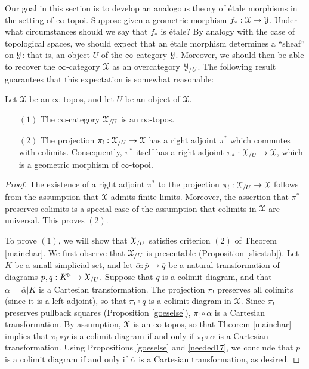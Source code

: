 Our goal in this section is to develop an analogous theory of \'{e}tale morphisms in the setting of $\infty$-topoi. Suppose given a geometric morphism
$f_{\ast}: \operatorname{\mathcal{X}} \rightarrow \operatorname{\mathcal{Y}}$. Under what circumstances should we say that
$f_{\ast}$ is \'{e}tale? By analogy with the case of topological spaces, we should expect that an \'{e}tale morphism determines a ``sheaf'' on $\operatorname{\mathcal{Y}}$: that is, an object $U$ of the $\infty$-category $\operatorname{\mathcal{Y}}$. Moreover, we should then be able to recover the $\infty$-category $\operatorname{\mathcal{X}}$ as an overcategory $\operatorname{\mathcal{Y}}_{/U}$. 
The following result guarantees that this expectation is somewhat reasonable:

\begin{proposition}\label{generalslice}
Let $\operatorname{\mathcal{X}}$ be an $\infty$-topos, and let $U$ be an object of $\operatorname{\mathcal{X}}$.
\begin{itemize}
\item[$(1)$] The $\infty$-category $\operatorname{\mathcal{X}}_{/U}$ is an $\infty$-topos.
\item[$(2)$] The projection $\pi_{!}: \operatorname{\mathcal{X}}_{/U} \rightarrow \operatorname{\mathcal{X}}$ has a right adjoint $\pi^{\ast}$ which
commutes with colimits. Consequently, $\pi^{\ast}$ itself has a right adjoint $\pi_{\ast}: \operatorname{\mathcal{X}}_{/U} \rightarrow \operatorname{\mathcal{X}}$, which is a geometric morphism of $\infty$-topoi.
\end{itemize}
\end{proposition}

\begin{proof}
The existence of a right adjoint $\pi^{\ast}$ to the projection $\pi_{!}: \operatorname{\mathcal{X}}_{/U} \rightarrow \operatorname{\mathcal{X}}$ follows from the assumption that $\operatorname{\mathcal{X}}$ admits finite limits. Moreover, the assertion that $\pi^{\ast}$ preserves colimits is a special case of the assumption that colimits in $\operatorname{\mathcal{X}}$ are universal. This proves $(2)$.

To prove $(1)$, we will show that $\operatorname{\mathcal{X}}_{/U}$ satisfies criterion $(2)$ of Theorem \ref{mainchar}. 
We first observe that $\operatorname{\mathcal{X}}_{/U}$ is presentable (Proposition \ref{slicstab}).
Let $K$ be a small simplicial set, and let $\overline{\alpha}: \overline{p} \rightarrow \overline{q}$
be a natural transformation of diagrams $\overline{p}, \overline{q}: K^{\triangleright}
\rightarrow \operatorname{\mathcal{X}}_{/U}$. Suppose that $\overline{q}$ is a colimit diagram, and that
$\alpha = \overline{\alpha} | K$ is a Cartesian transformation. The projection
$\pi_{!}$ preserves all colimits (since it is a left adjoint), so that $\pi_{!} \circ \overline{q}$ is a colimit
diagram in $\operatorname{\mathcal{X}}$. Since $\pi_{!}$ preserves pullback squares (Proposition \ref{goeselse}), $\pi_{!} \circ \alpha$
is a Cartesian transformation. By assumption, $\operatorname{\mathcal{X}}$ is an $\infty$-topos, so that
Theorem \ref{mainchar} implies that $\pi_{!} \circ \overline{p}$ is a colimit diagram
if and only if $\pi_{!} \circ \overline{\alpha}$ is a Cartesian transformation. Using
Propositions \ref{goeselse} and \ref{needed17}, we conclude
that $\overline{p}$ is a colimit diagram if and only if $\overline{\alpha}$ is a Cartesian transformation, as desired.
\end{proof}

